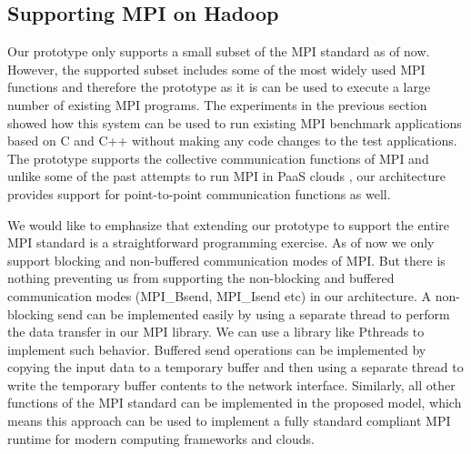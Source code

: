 \documentclass[conference,10pt] {IEEEtran}
\begin{document}
\subsection{Supporting MPI on Hadoop}
Our prototype only supports a small subset of the MPI standard as of now. However, the supported subset includes some of the most widely used MPI functions and therefore the prototype as it is can be used to execute a large number of existing MPI programs. The experiments in the previous section showed how this system can be used to run existing MPI benchmark applications based on C and C++ without making any code changes to the test applications. The prototype supports the collective communication functions of MPI and unlike some of the past attempts to run MPI in PaaS clouds \cite{SS12}, our architecture provides support for point-to-point communication functions as well. 

We would like to emphasize that extending our prototype to support the entire MPI standard is a straightforward programming exercise. As of now we only support blocking and non-buffered communication modes of MPI. But there is nothing preventing us from supporting the non-blocking and buffered communication modes (MPI\_Bsend, MPI\_Isend etc) in our architecture. A non-blocking send can be implemented easily by using a separate thread to perform the data transfer in our MPI library. We can use a library like Pthreads to implement such behavior. Buffered send operations can be implemented by copying the input data to a temporary buffer and then using a separate thread to write the temporary buffer contents to the network interface. Similarly, all other functions of the MPI standard can be implemented in the proposed model, which means this approach can be used to implement a fully standard compliant MPI runtime for modern computing frameworks and clouds.
\end{document}
